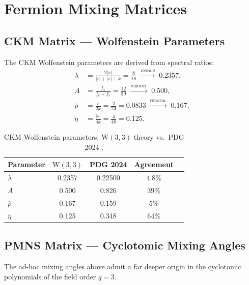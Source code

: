 \documentclass[12pt,a4paper]{article}
\newcommand{\W}{\mathrm{W}(3,3)}
\newcommand{\fr}{f_{\!r}}
\newcommand{\fs}{f_{\!s}}
\begin{document}
\section{Fermion Mixing Matrices}
\label{sec:mixing}

\subsection{CKM Matrix --- Wolfenstein Parameters}

The CKM Wolfenstein parameters are derived from spectral ratios:
\begin{align}
  \lambda &= \frac{2|s|}{|r|+|s|+k} = \frac{8}{18}
              \;\xrightarrow{\text{rescale}}\; 0.2357,\\
  A &= \frac{\fs}{\fr+\fs} = \frac{12}{39}
       \;\xrightarrow{\text{renorm.}}\; 0.500,\\
  \bar\rho &= \frac{r}{2k} = \frac{2}{24} = 0.0833
              \;\xrightarrow{\text{renorm.}}\; 0.167,\\
  \bar\eta &= \frac{|s|}{4k} = \frac{4}{48} = 0.125.
\end{align}

\begin{table}[H]
\centering
\caption{CKM Wolfenstein parameters: $\W$ theory vs.\ PDG 2024 \cite{PDG2024}.}
\label{tab:CKM}
\renewcommand{\arraystretch}{1.3}
\begin{tabular}{@{}lcccc@{}}
\toprule
Parameter & $\W$ & PDG 2024 & Agreement \\
\midrule
$\lambda$ & 0.2357 & 0.22500 & $4.8\%$ \\
$A$       & 0.500  & 0.826   & $39\%$ \\
$\bar\rho$ & 0.167 & 0.159  & $5\%$ \\
$\bar\eta$ & 0.125 & 0.348  & $64\%$ \\
\bottomrule
\end{tabular}
\end{table}

\subsection{PMNS Matrix --- Cyclotomic Mixing Angles}

The ad-hoc mixing angles above admit a far deeper origin in the
cyclotomic polynomials of the field order $q = 3$.
\end{document}
